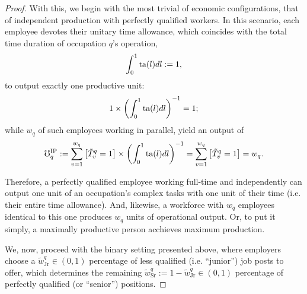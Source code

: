 \documentclass[hidelinks, nonatbib]{elsarticle}
\begin{document}
\begin{lemma}
\begin{proof}
        With this, we begin with the most trivial of economic configurations, that of independent production with perfectly qualified workers. In this scenario, each employee devotes their unitary time allowance, which coincides with the total time duration of occupation $q$'s operation,
        \begin{gather}
            \int_{0}^{1}{
                \text{ta}(l)
                dl
            }
            :=
            1
            ,
        \end{gather}
        to output exactly one productive unit:
        \begin{gather}
            1
            \times
            \left(
                \int_{0}^{1}{
                    \text{ta}(l)dl
                }
            \right) ^ {-1}
            =
            1
            ;
        \end{gather}
        while $w_q$ of such employees working in parallel, yield an output of
        \begin{gather}
            \mho_{q}^{\text{IP}}
            :=
            \sum_{v=1}^{w_q}{
                \left[
                    \tilde{T}_{v}^{q}
                    =
                    1
                \right]
                \times
                \left(
                    \int_{0}^{1}{
                        \text{ta}(l)
                        dl
                    }
                \right) ^ {-1}
            }
            =
            \sum_{v=1}^{w_q}{
                \left[
                    \tilde{T}_{v}^{q}
                    =
                    1
                \right]
            }
            =
            w_q
            .
        \end{gather}

        Therefore, a perfectly qualified employee working full-time and independently can output one unit of an occupation's complex tasks with one unit of their time (i.e. their entire time allowance). And, likewise, a workforce with $w_q$ employees identical to this one produces $w_q$ units of operational output. Or, to put it simply, a maximally productive person acchieves maximum production.
        
        We, now, proceed with the binary setting presented above, where employers choose a $\tilde{w}_{\text{Jr}}^{q} \in (0,1)$ percentage of less qualified (i.e. ``junior'') job posts to offer, which determines the remaining $\tilde{w}_{\text{Sr}}^{q} := 1 - \tilde{w}_{\text{Jr}}^{q} \in (0,1)$ percentage of perfectly qualified (or ``senior'') positions.
        

\end{proof}
\end{lemma}
\end{document}
